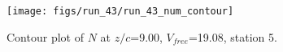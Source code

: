 \begin{figure}[H]
\centering
\texttt{[image: figs/run\_43/run\_43\_num\_contour]}
\caption{Contour plot of $N$ at $z/c$=9.00, $V_{free}$=19.08, station 5.}
\label{fig:run_43_num_contour}
\end{figure}


